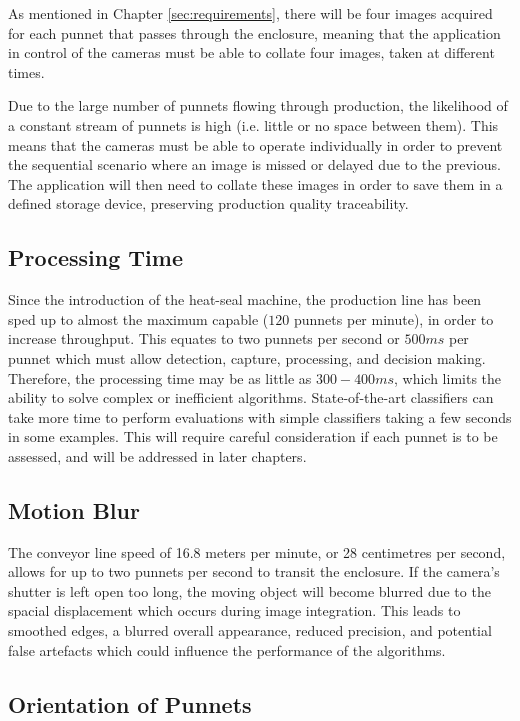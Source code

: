 \documentclass[fleqn,twoside,12pt]{report}
\begin{document}
As mentioned in Chapter \ref{sec:requirements}, there will be four images acquired for each punnet that passes through the enclosure, meaning that the application in control of the cameras must be able to collate four images, taken at different times.

Due to the large number of punnets flowing through production, the likelihood of a constant stream of punnets is high (i.e. little or no space between them). This means that the cameras must be able to operate individually in order to prevent the sequential scenario where an image is missed or delayed due to the previous. The application will then need to collate these images in order to save them in a defined storage device, preserving production quality traceability.    

\subsection{Processing Time}

Since the introduction of the heat-seal machine, the production line has been sped up to almost the maximum capable ($120$ punnets per minute), in order to increase throughput. This equates to two punnets per second or $500ms$ per punnet which must allow detection, capture, processing, and decision making. Therefore, the processing time may be as little as $300-400ms$, which limits the ability to solve complex or inefficient algorithms. State-of-the-art classifiers can take more time to perform evaluations with simple classifiers taking a few seconds in some examples. This will require careful consideration if each punnet is to be assessed, and will be addressed in later chapters.


\subsection{Motion Blur}

The conveyor line speed of 16.8 meters per minute, or 28 centimetres per second, allows for up to two punnets per second to transit the enclosure. If the camera's shutter is left open too long, the moving object will become blurred due to the spacial displacement which occurs during image integration. This leads to smoothed edges, a blurred overall appearance, reduced precision, and potential false artefacts which could influence the performance of the algorithms.



\subsection{Orientation of Punnets}
\end{document}
